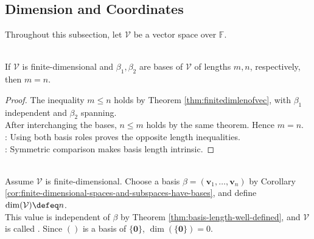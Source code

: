 \subsection{Dimension and Coordinates}

Throughout this subsection, let $\mathcal{V}$ be a vector space over $\mathbb{F}$.

\begin{theorem} \label{thm:basis-length-well-defined} \\
If $\mathcal{V}$ is finite-dimensional and $\beta_1,\beta_2$ are bases of $\mathcal{V}$ of lengths $m,n$, respectively, then $m=n$.
\begin{proof}
The inequality $m\leq n$ holds by Theorem \ref{thm:finitedimlenofvec}, with $\beta_1$ independent and $\beta_2$ spanning.\\
After interchanging the bases, $n\leq m$ holds by the same theorem. Hence $m=n$.\\
: Using both basis roles proves the opposite length inequalities.\\
: Symmetric comparison makes basis length intrinsic.
\end{proof}
\end{theorem}

\begin{definition} \label{def:dimension} \\
Assume $\mathcal{V}$ is finite-dimensional. Choose a basis $\beta=(\mathbf{v}_1,\ldots,\mathbf{v}_n)$ by Corollary \ref{cor:finite-dimensional-spaces-and-subspaces-have-bases}, and define $\dim(\mathcal{V})\defeq n$.\\
This value is independent of $\beta$ by Theorem \ref{thm:basis-length-well-defined}, and $\mathcal{V}$ is called . Since $()$ is a basis of $\{\mathbf{0}\}$, $\dim(\{\mathbf{0}\})=0$.
\end{definition}

